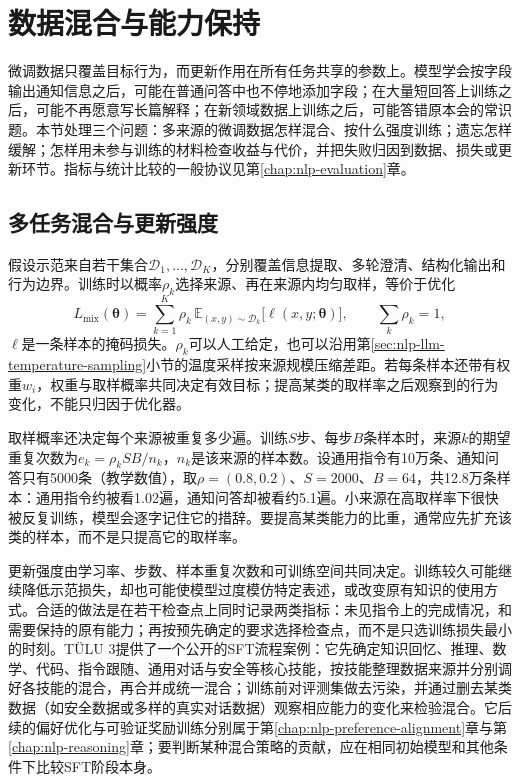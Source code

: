 \section{数据混合与能力保持}
\label{sec:nlp-sft-retention}

微调数据只覆盖目标行为，而更新作用在所有任务共享的参数上。模型学会按字段输出通知信息之后，可能在普通问答中也不停地添加字段；在大量短回答上训练之后，可能不再愿意写长篇解释；在新领域数据上训练之后，可能答错原本会的常识题。本节处理三个问题：多来源的微调数据怎样混合、按什么强度训练；遗忘怎样缓解；怎样用未参与训练的材料检查收益与代价，并把失败归因到数据、损失或更新环节。指标与统计比较的一般协议见第\ref{chap:nlp-evaluation}章。

\subsection{多任务混合与更新强度}
\label{sec:nlp-sft-mixture-strength}

假设示范来自若干集合$\mathcal{D}_1,\ldots,\mathcal D_K$，分别覆盖信息提取、多轮澄清、结构化输出和行为边界。训练时以概率$\rho_k$选择来源、再在来源内均匀取样，等价于优化
\begin{equation}
 L_{\mathrm{mix}}(\bm\theta)=\sum_{k=1}^{K}\rho_k\,\mathbb{E}_{(x,y)\sim\mathcal{D}_k}\bigl[\ell(x,y;\bm\theta)\bigr],
 \qquad \sum_k\rho_k=1,
 \label{eq:nlp-sft-mixture}
\end{equation}
$\ell$是一条样本的掩码损失。$\rho_k$可以人工给定，也可以沿用第\ref{sec:nlp-llm-temperature-sampling}小节的温度采样按来源规模压缩差距。若每条样本还带有权重$w_i$，权重与取样概率共同决定有效目标；提高某类的取样率之后观察到的行为变化，不能只归因于优化器。

取样概率还决定每个来源被重复多少遍。训练$S$步、每步$B$条样本时，来源$k$的期望重复次数为$e_k=\rho_kSB/n_k$，$n_k$是该来源的样本数。设通用指令有10万条、通知问答只有5000条（教学数值），取$\rho=(0.8,0.2)$、$S=2000$、$B=64$，共12.8万条样本：通用指令约被看1.02遍，通知问答却被看约5.1遍。小来源在高取样率下很快被反复训练，模型会逐字记住它的措辞。要提高某类能力的比重，通常应先扩充该类的样本，而不是只提高它的取样率。

更新强度由学习率、步数、样本重复次数和可训练空间共同决定。训练较久可能继续降低示范损失，却也可能使模型过度模仿特定表述，或改变原有知识的使用方式。合适的做法是在若干检查点上同时记录两类指标：未见指令上的完成情况，和需要保持的原有能力；再按预先确定的要求选择检查点，而不是只选训练损失最小的时刻。TÜLU 3提供了一个公开的SFT流程案例：它先确定知识回忆、推理、数学、代码、指令跟随、通用对话与安全等核心技能，按技能整理数据来源并分别调好各技能的混合，再合并成统一混合；训练前对评测集做去污染，并通过删去某类数据（如安全数据或多样的真实对话数据）观察相应能力的变化来检验混合。它后续的偏好优化与可验证奖励训练分别属于第\ref{chap:nlp-preference-alignment}章与第\ref{chap:nlp-reasoning}章；要判断某种混合策略的贡献，应在相同初始模型和其他条件下比较SFT阶段本身。


